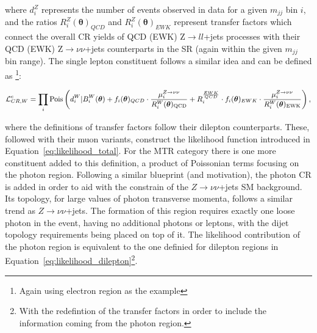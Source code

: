 where $d_i^Z$ represents the number of events observed in data for a given $m_{jj}$ bin $i$, and the ratios $R_i^Z(\boldsymbol{\theta})_{QCD}$ and $R_i^Z(\boldsymbol{\theta})_{EWK}$ represent transfer factors which connect the overall CR yields of QCD (EWK) Z$\rightarrow ll$+jets processes with their QCD (EWK) Z$\rightarrow \nu\nu$+jets counterparts in the SR (again within the given $m_{jj}$ bin range). The single lepton constituent follows a similar idea and can be defined as \footnote{Again using electron region as the example}:

\begin{equation}
\small{
    \mathcal{L}_{CR,W}^{e} = \prod_{i} \mathrm{Pois} \left(d^{W}_{i}|B^{W}_{i}(\boldsymbol{\theta}) + f_i(\boldsymbol{\theta})_{QCD} \cdot \frac{\mu_i^{Z\rightarrow \nu\nu}}{R^{W}_{i} (\boldsymbol{\theta})_{\mathrm{QCD}}} + R^{\frac{EWK}{QCD}}_{i} \cdot f_i(\boldsymbol{\theta})_{EWK} \cdot \frac{\mu_i^{Z\rightarrow \nu\nu} }{R^{W}_{i} (\boldsymbol{\theta})_{\mathrm{EWK}}} \right),}
\end{equation}

where the definitions of transfer factors follow their dilepton counterparts. These, followed with their muon variants, construct the likelihood function introduced in Equation~\ref{eq:likelihood_total}. For the MTR category there is one more constituent added to this definition, a product of Poissonian terms focusing on the photon region. Following a similar blueprint (and motivation), the photon CR is added in order to aid with the constrain of the $Z\rightarrow \nu\nu$+jets SM background. Its topology, for large values of photon transverse momenta, follows a similar trend as $Z\rightarrow \nu\nu$+jets. The formation of this region requires exactly one loose photon in the event, having no additional photons or leptons, with the dijet topology requirements being placed on top of it. The likelihood contribution of the photon region is equivalent to the one definied for dilepton regions in Equation~\ref{eq:likelihood_dilepton}\footnote{With the redefintion of the transfer factors in order to include the information coming from the photon region.}.


